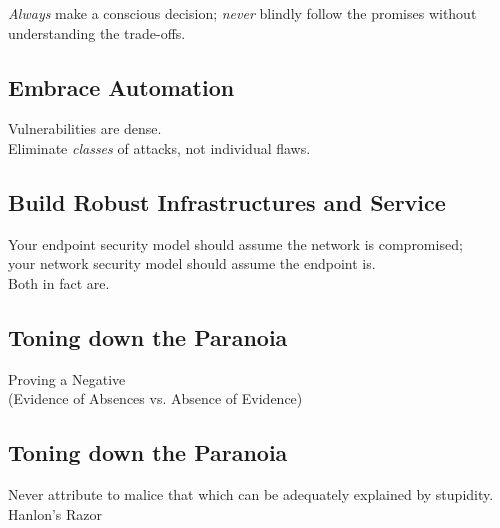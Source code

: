 \documentclass[xga]{xdvislides}
\begin{document}
\addvspace{.25in}
{\em Always} make a conscious decision; {\em never} blindly follow
the promises without understanding the trade-offs.

\subsection{Embrace Automation}
\vspace*{\fill}
\Huge
\begin{center}
	Vulnerabilities are dense. \\
\addvspace{.5in}
	Eliminate {\em classes} of attacks, not
	individual flaws. \\
\end{center}
\Normalsize
\vspace*{\fill}

\subsection{Build Robust Infrastructures and Service}
\vspace*{\fill}
\Huge
\begin{center}
	Your endpoint security model should assume the
	network is compromised; \\
	your network security model should assume the
	endpoint is. \\
\addvspace{.5in}
	Both in fact are.
\end{center}
\Normalsize
\vspace*{\fill}

\subsection{Toning down the Paranoia}
\vspace*{\fill}
\begin{center}
    \Hugesize
        Proving a Negative \\
	\vspace{.25in}
	\Normalsize
	(Evidence of Absences vs. Absence of Evidence)
\end{center}
\vspace*{\fill}


\subsection{Toning down the Paranoia}
\vspace*{\fill}
\Huge
\begin{center}
Never attribute to malice that which can be adequately explained by stupidity. \\
\vspace{.25in}
\Normalsize
Hanlon's Razor
\end{center}
\Normalsize
\vspace*{\fill}
\end{document}

